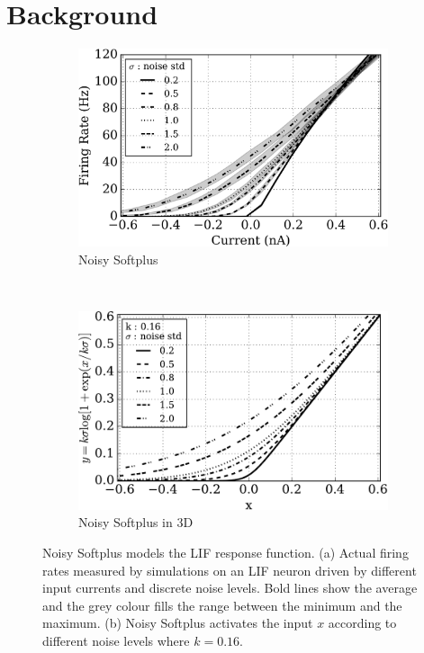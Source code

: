\documentclass{article}
\begin{document}
\section{Background}
\label{sec:back}
\begin{figure}[thb!]
	\centering
	\begin{subfigure}[t]{0.4\textwidth}
		\includegraphics[width=\textwidth]{pics_iconip/siegert.png}
		\caption{Noisy Softplus}
    \label{fig:ns-behaviour}
	\end{subfigure}~~~~~~
	\begin{subfigure}[t]{0.4\textwidth}
		\includegraphics[width=\textwidth]{pics_iconip/4.pdf}
		\caption{Noisy Softplus in 3D}
    \label{fig:ns-fixed-k}
	\end{subfigure}
	\caption{
		Noisy Softplus models the LIF response function.
		(a) Actual firing rates measured by simulations on an LIF neuron driven by different input currents and discrete noise levels.
		Bold lines show the average and the grey colour fills the range between the minimum and the maximum.
		(b) Noisy Softplus activates the input $x$ according to different noise levels where $k=0.16$.}
	\label{fig:ns}
\end{figure}
\end{document}
